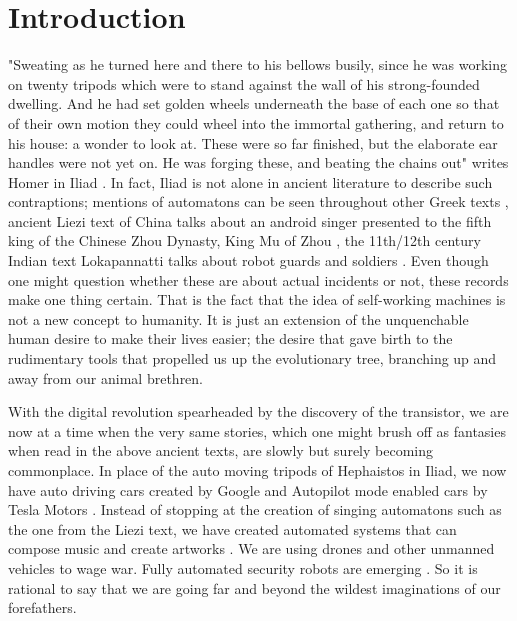 \section{Introduction}
\label{sec:-intro}
"Sweating as he turned here and there to his bellows busily, since he was working on twenty tripods which were to stand against the wall of his strong-founded dwelling. And he had set golden wheels underneath the base of each one so that of their own motion they could wheel into the immortal gathering, and return to his house: a wonder to look at. These were so far finished, but the elaborate ear handles were not yet on. He was forging these, and beating the chains out" writes Homer in Iliad \cite{homer1194iliad}. In fact, Iliad is not alone in ancient literature to describe such contraptions; mentions of automatons can be seen throughout other Greek texts \cite{aaron2015automatones}, ancient Liezi text of China talks about an android singer presented to the fifth king of the Chinese Zhou Dynasty, King Mu of Zhou \cite{lie600liezi}, the 11th/12th century Indian text Lokapannatti talks about robot guards and soldiers \cite{sarah1997lokapannatti}. Even though one might question whether these are about actual incidents or not, these records make one thing certain. That is the fact that the idea of self-working machines is not a new concept to humanity. It is just an extension of the unquenchable human desire to make their lives easier; the desire that gave birth to the rudimentary tools that propelled us up the evolutionary tree, branching up and away from our animal brethren. 

With the digital revolution spearheaded by the discovery of the transistor, we are now at a time when the very same stories, which one might brush off as fantasies when read in the above ancient texts, are slowly but surely becoming commonplace. In place of the auto moving tripods of Hephaistos in Iliad, we now have auto driving cars created by Google \cite{google2016car} and Autopilot mode enabled cars by Tesla Motors \cite{tesla2016car}. Instead of stopping at the creation of singing automatons such as the one from the Liezi text, we have created automated systems that can compose music \cite{liu2014bach} and create artworks \cite{james2016art}. We are using drones and other unmanned vehicles to wage war. Fully automated security robots are emerging \cite{justin2016security}. So it is rational to say that we are going far and beyond the wildest imaginations of our forefathers. 

